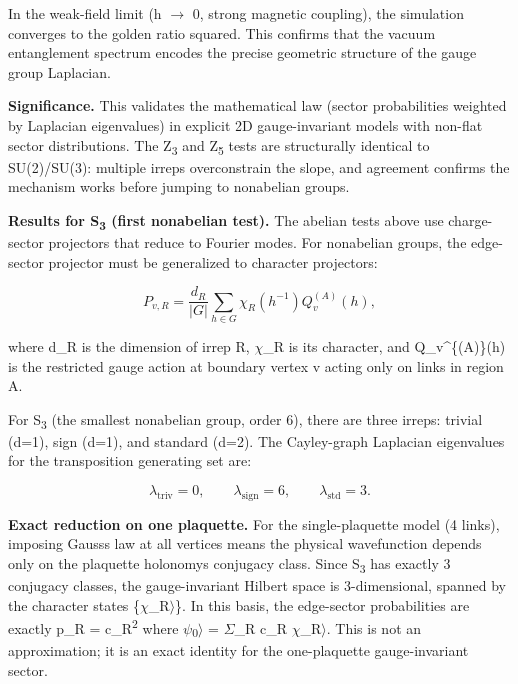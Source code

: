 In the weak-field limit (h \ensuremath{\to} 0, strong magnetic coupling), the simulation converges to the golden ratio squared. This confirms that the vacuum entanglement spectrum encodes the precise geometric structure of the gauge group Laplacian.

\textbf{Significance.} This validates the mathematical law (sector probabilities weighted by Laplacian eigenvalues) in explicit 2D gauge-invariant models with non-flat sector distributions. The Z\textsubscript{3} and Z\textsubscript{5} tests are structurally identical to SU(2)/SU(3): multiple irreps overconstrain the slope, and agreement confirms the mechanism works before jumping to nonabelian groups.

\textbf{Results for S\textsubscript{3} (first nonabelian test).} The abelian tests above use charge-sector projectors that reduce to Fourier modes. For nonabelian groups, the edge-sector projector must be generalized to character projectors:

\[
P_{v,R} = \frac{d_R}{|G|} \sum_{h \in G} \chi_R(h^{-1}) Q_v^{(A)}(h),
\]

where d\_R is the dimension of irrep R, \ensuremath{\chi}\_R is its character, and Q\_v\^{}\{(A)\}(h) is the restricted gauge action at boundary vertex v acting only on links in region A.

For S\textsubscript{3} (the smallest nonabelian group, order 6), there are three irreps: trivial (d=1), sign (d=1), and standard (d=2). The Cayley-graph Laplacian eigenvalues for the transposition generating set are:

\[
\lambda_{\mathrm{triv}} = 0, \qquad \lambda_{\mathrm{sign}} = 6, \qquad
\lambda_{\mathrm{std}} = 3.
\]

\textbf{Exact reduction on one plaquette.} For the single-plaquette model (4 links), imposing Gauss\textquotesingle s law at all vertices means the physical wavefunction depends only on the plaquette holonomy\textquotesingle s conjugacy class. Since S\textsubscript{3} has exactly 3 conjugacy classes, the gauge-invariant Hilbert space is 3-dimensional, spanned by the character states \{\textbar \ensuremath{\chi}\_R\ensuremath{\rangle}\}. In this basis, the edge-sector probabilities are exactly p\_R = \textbar c\_R\textbar\textsuperscript{2} where \textbar \ensuremath{\psi}\textsubscript{0}\ensuremath{\rangle} = \ensuremath{\Sigma}\_R c\_R \textbar \ensuremath{\chi}\_R\ensuremath{\rangle}. This is not an approximation; it is an exact identity for the one-plaquette gauge-invariant sector.

